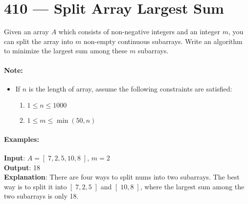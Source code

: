 \section{410 --- Split Array Largest Sum}
Given an array $A$ which consists of non-negative integers and an integer $ m $, you can split the array into $ m $ non-empty continuous subarrays. Write an algorithm to minimize the largest sum among these $ m $ subarrays.

\paragraph{Note:}
\begin{itemize}
\item If $ n $ is the length of array, assume the following constraints are satisfied:

\begin{enumerate}
\item    $ 1 \leq n \leq 1000$
\item    $ 1 \leq m \leq \min(50, n)$
\end{enumerate}
\end{itemize}

\paragraph{Examples:}

\begin{flushleft}
\textbf{Input}: $A = [\;7,2,5,10,8\;]$, $m = 2$
\\
\textbf{Output}: 18
\\
\textbf{Explanation}: There are four ways to split nums into two subarrays. The best way is to split it into $[\;7,2,5\;]$ and $[\;10,8\;]$, where the largest sum among the two subarrays is only 18.
\end{flushleft}

